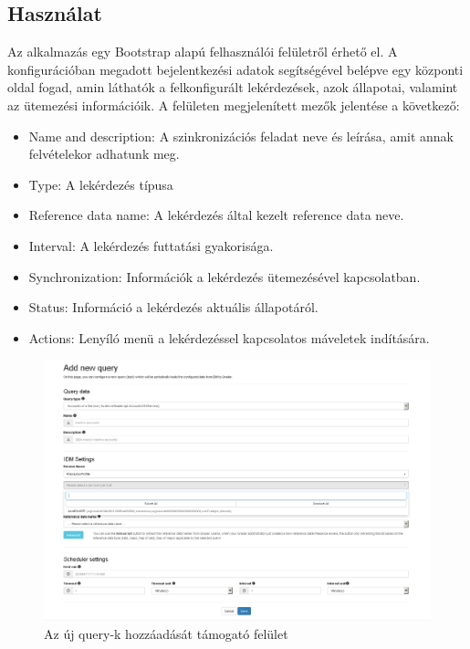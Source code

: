 \subsection{Használat}

Az alkalmazás egy Bootstrap alapú felhasználói felületről érhető el. A konfigurációban megadott bejelentkezési adatok segítségével belépve egy központi oldal fogad, amin láthatók a felkonfigurált lekérdezések, azok állapotai, valamint az ütemezési információik. A felületen megjelenített mezők jelentése a következő:



\begin{itemize}
	\item Name and description: A szinkronizációs feladat neve és leírása, amit annak felvételekor adhatunk meg.
	\item Type: A lekérdezés típusa
	\item Reference data name: A lekérdezés által kezelt reference data neve.
	\item Interval: A lekérdezés futtatási gyakorisága.
	\item Synchronization: Információk a lekérdezés ütemezésével kapcsolatban.
	\item Status: Információ a lekérdezés aktuális állapotáról.
	\item Actions: Lenyíló menü a lekérdezéssel kapcsolatos máveletek indítására.
\end{itemize}
\begin{figure}[!h]
	\centering
	\includegraphics[width=0.8\linewidth]{figures/refloader_ui/add_new2}
	\caption{Az új query-k hozzáadását támogató felület}
	\label{fig:addnew}
\end{figure}

